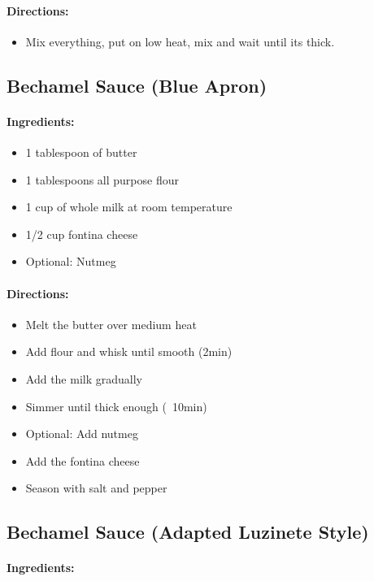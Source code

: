 \documentclass{article}
\begin{document}
\paragraph{Directions:}
\begin{itemize}
	\item Mix everything, put on low heat, mix and wait until its thick.
\end{itemize}

\subsection{Bechamel Sauce (Blue Apron)}

\paragraph{Ingredients:}

\begin{itemize}
\item 1 tablespoon of butter
\item 1 tablespoons all purpose flour
\item 1 cup of whole milk at room temperature
\item 1/2 cup fontina cheese
\item Optional: Nutmeg
\end{itemize}

\paragraph{Directions:}
\begin{itemize}
\item Melt the butter over medium heat
\item Add flour and whisk until smooth (2min)
\item Add the milk gradually
\item Simmer until thick enough (~10min)
\item Optional: Add nutmeg
\item Add the fontina cheese
\item Season with salt and pepper
\end{itemize}

\subsection{Bechamel Sauce (Adapted Luzinete Style)}

\paragraph{Ingredients:}
\end{document}
